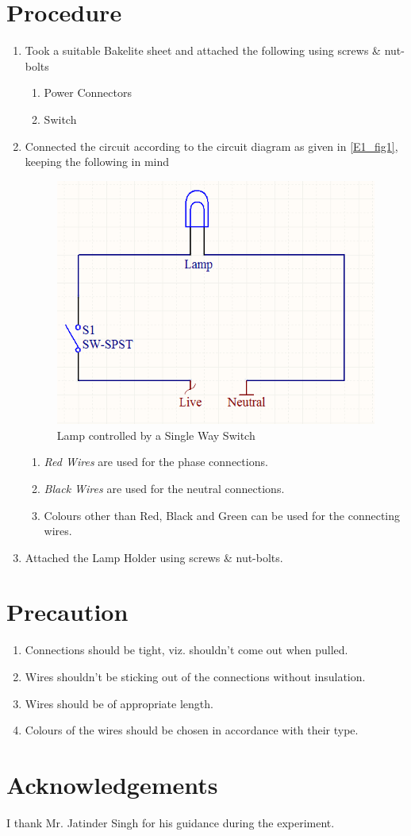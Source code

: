 \section{Procedure}
	\begin{enumerate}
		\item Took a suitable Bakelite sheet and attached the following using screws \& nut-bolts
			\begin{enumerate}
				\item Power Connectors
				\item Switch
			\end{enumerate} 
		\item Connected the circuit according to the circuit diagram as given in \autoref{E1_fig1}, keeping the following in mind
		\begin{figure}[bth]
			\begin{center}
				\includegraphics[width=.8\linewidth]{gfx/circuit1}
			\end{center}
		\caption[Lamp - Single Way Switch]{Lamp controlled by a Single Way Switch}\label{E1_fig1}
		\end{figure}

			\begin{enumerate}
				\item \emph{Red Wires} are used for the phase connections.
				\item \emph{Black Wires} are used for the neutral connections.
				\item Colours other than Red, Black and Green can be used for the connecting wires.
			\end{enumerate}	
		\item Attached the Lamp Holder using screws \& nut-bolts.
	\end{enumerate}
\section{Precaution}
	\begin{enumerate}
		\item Connections should be tight, viz. shouldn't come out when pulled.
		\item Wires shouldn't be sticking out of the connections without insulation.
		\item Wires should be of appropriate length.
		\item Colours of the wires should be chosen in accordance with their type.
	\end{enumerate}	
\section{Acknowledgements}
I thank Mr. Jatinder Singh for his guidance during the experiment.